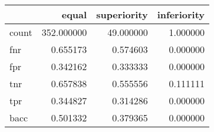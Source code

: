 \begin{tabular}{lrrr}
\toprule
{} &       equal &  superiority &  inferiority \\
\midrule
count &  352.000000 &    49.000000 &     1.000000 \\
fnr   &    0.655173 &     0.574603 &     0.000000 \\
fpr   &    0.342162 &     0.333333 &     0.000000 \\
tnr   &    0.657838 &     0.555556 &     0.111111 \\
tpr   &    0.344827 &     0.314286 &     0.000000 \\
bacc  &    0.501332 &     0.379365 &     0.000000 \\
\bottomrule
\end{tabular}
